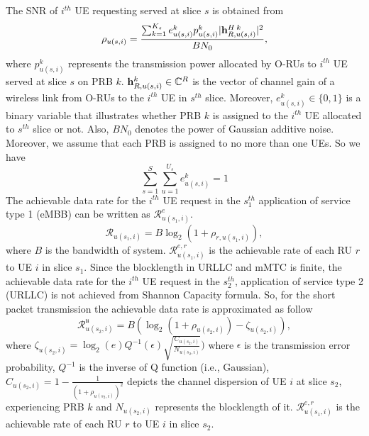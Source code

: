 \documentclass[conference]{IEEEtran}
\begin{document}
The SNR of $i^{th}$ UE requesting  served at slice $s$ is obtained from
\begin{equation}\label{eq2}
\rho_{u(s,i)} =  \frac{\sum_{k=1}^{K_{s}}e_{u(s,i)}^k p_{u(s,i)}^{k}|{\bold{h}_{R,u(s,i)}^{H \: k}}|^2}{BN_0},
\end{equation} 
where $p_{u(s,i)}^{k}$ represents the transmission power allocated by O-RUs to $i^{th}$ UE served at slice $s$ on PRB $k$.
${\bold{h}_{R,u(s,i)}^{k}} \in \mathbb{C}^{R}$ is the vector of channel gain of a wireless link from 
O-RUs to the $i^{th}$ UE in $s^{th}$ slice. 
Moreover, $e_{u(s,i)}^k \in \{0,1\}$ is a binary variable that illustrates whether PRB $k$ is assigned to the $i^{th}$ UE allocated to $s^{th}$ slice or not. 
Also, $BN_0$ denotes the power of Gaussian additive noise.
Moreover, we assume that each PRB is assigned to no more than one UEs. So we have
\begin{equation}
\sum_{s=1}^S \sum_{u=1}^{U_s} e_{u(s,i)}^k = 1
\end{equation} 
The achievable data rate for the $i^{th}$ UE request in the $s_{1}^{th}$ application of service type 1 (eMBB) can be written as $\mathcal{R}_{u(s_1,i)}^{e}$.
\begin{equation}\label{eq1}
\mathcal{R}_{u(s_1,i)} =  B \log_2({1+ \rho_{r,u(s_1,i)}}),
\end{equation}
where $B$ is the bandwidth of system. 
$\mathcal{R}_{u(s_1,i)}^{e,r}$ is the achievable rate of each RU $r$ to UE $i$ in slice $s_1$.
Since the blocklength in URLLC and mMTC is finite, the achievable data rate for the $i^{th}$ UE request in the $s_{2}^{th} $, application of service type 2 (URLLC) is not achieved from Shannon Capacity formula. So, for the short packet transmission the achievable data rate is approximated as follow
\begin{equation}\label{eq11}
\mathcal{R}_{u(s_2,i)}^{\mathfrak{u}} =  B (\log_2({1+ \rho_{u(s_2,i)}})- \zeta_{u(s_2,i)}), 
\end{equation}
where $\zeta_{u(s_2,i)} = \log_2({e})Q^{-1}(\epsilon) \sqrt{\frac{C_{u(s_2,i)}}{N_{u(s_2,i)}}})$
where $\epsilon$ is the transmission error probability, $Q^{-1}$ is the inverse of Q function (i.e., Gaussian),
$C_{u(s_2,i)} = 1 - \frac{1}{(1+\rho_{u(s_2,i)})^2}$ depicts the channel dispersion of UE  $i$ at slice $s_2$, experiencing PRB $k$ and
$N_{u(s_2,i)}$ represents the blocklength of it. 
$\mathcal{R}_{u(s_1,i)}^{e,r}$ is the achievable rate of each RU $r$ to UE $i$ in slice $s_2$.
\end{document}
